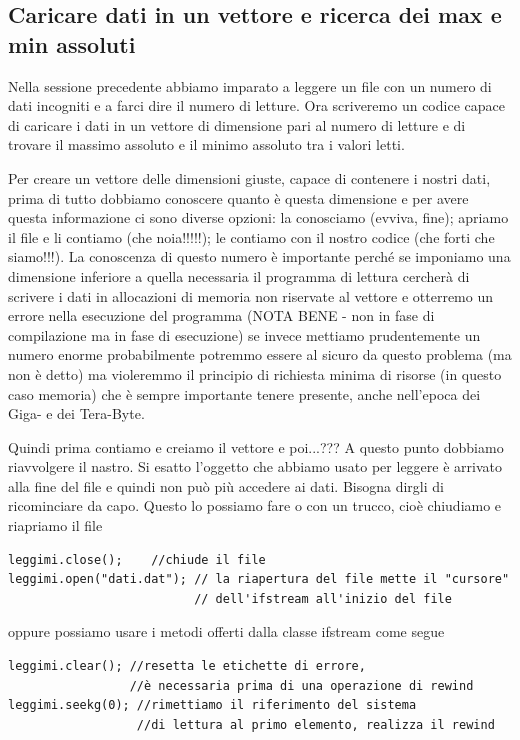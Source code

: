 \documentclass[11pt,fleqn]{book} %
\begin{document}
\subsection{Caricare dati in un vettore e ricerca dei max e min assoluti}

Nella sessione precedente abbiamo imparato a leggere un file con un numero di dati incogniti e a farci dire il numero di letture.
Ora scriveremo un codice capace di caricare i dati in un vettore di dimensione pari al numero di letture e di trovare il massimo assoluto e il minimo assoluto tra i valori letti.

Per creare un vettore delle dimensioni giuste, capace di contenere i nostri dati, prima di tutto dobbiamo conoscere quanto è questa dimensione e per avere questa informazione ci sono diverse opzioni: la conosciamo (evviva, fine); apriamo il file e li contiamo (che noia!!!!!); le contiamo con il nostro codice (che forti che siamo!!!). La conoscenza di questo numero è importante perché se imponiamo una dimensione inferiore a quella necessaria il programma di lettura cercherà di scrivere i dati in allocazioni di memoria non riservate al vettore e otterremo un errore nella esecuzione del programma (NOTA BENE - non in fase di compilazione ma in fase di esecuzione) se invece mettiamo prudentemente un numero enorme probabilmente potremmo essere al sicuro da questo problema (ma non è detto) ma violeremmo il principio di richiesta minima di risorse (in questo caso memoria) che è sempre importante tenere presente, anche nell'epoca dei Giga- e dei Tera-Byte. 

Quindi prima contiamo e creiamo il vettore e poi...??? A questo punto dobbiamo riavvolgere il nastro. Si esatto l'oggetto che abbiamo usato per leggere è arrivato alla fine del file e quindi non può più accedere ai dati. Bisogna dirgli di ricominciare da capo. Questo lo possiamo fare o con un trucco, cioè chiudiamo e riapriamo il file
\begin{verbatim}
leggimi.close();    //chiude il file
leggimi.open("dati.dat"); // la riapertura del file mette il "cursore"
                          // dell'ifstream all'inizio del file
\end{verbatim}
oppure possiamo usare i metodi offerti dalla classe ifstream come segue
\begin{verbatim}
leggimi.clear(); //resetta le etichette di errore, 
                 //è necessaria prima di una operazione di rewind
leggimi.seekg(0); //rimettiamo il riferimento del sistema 
                  //di lettura al primo elemento, realizza il rewind

\end{verbatim}
\end{document}
